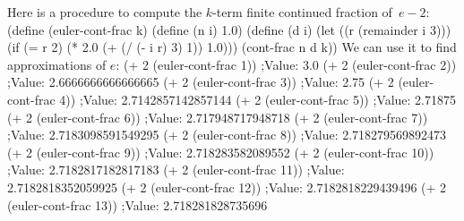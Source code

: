 Here is a procedure to compute the $k$-term finite continued fraction of~$e - 2$:
\begtt\scm 
(define (euler-cont-frac k)
  (define (n i) 1.0)
  (define (d i)
    (let ((r (remainder i 3)))
      (if (= r 2)
          (* 2.0 (+ (/ (- i r) 3) 1))
          1.0)))
  (cont-frac n d k))
\endtt
We can use it to find approximations of $e$: 
\begtt\scm
(+ 2 (euler-cont-frac 1))
;Value: 3.0
(+ 2 (euler-cont-frac 2))
;Value: 2.6666666666666665
(+ 2 (euler-cont-frac 3))
;Value: 2.75
(+ 2 (euler-cont-frac 4))
;Value: 2.7142857142857144
(+ 2 (euler-cont-frac 5))
;Value: 2.71875
(+ 2 (euler-cont-frac 6))
;Value: 2.717948717948718
(+ 2 (euler-cont-frac 7))
;Value: 2.7183098591549295
(+ 2 (euler-cont-frac 8))
;Value: 2.718279569892473
(+ 2 (euler-cont-frac 9))
;Value: 2.718283582089552
(+ 2 (euler-cont-frac 10))
;Value: 2.7182817182817183
(+ 2 (euler-cont-frac 11))
;Value: 2.7182818352059925
(+ 2 (euler-cont-frac 12))
;Value: 2.7182818229439496
(+ 2 (euler-cont-frac 13))
;Value: 2.718281828735696
\endtt
